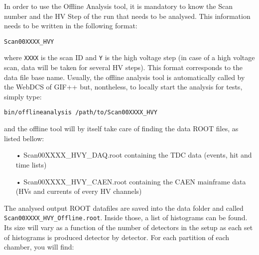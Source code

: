 	In order to use the Offline Analysis tool, it is mandatory to know the Scan number and the HV Step of the run that needs to be analysed. This information needs to be written in the following format:
	
	\begin{verbatim}
Scan00XXXX_HVY
	\end{verbatim}

	where \verb+XXXX+ is the scan ID and \verb+Y+ is the high voltage step (in case of a high voltage scan, data will be taken for several HV steps). This format corresponds to the data file base name. Usually, the offline analysis tool is automatically called by the WebDCS of GIF++ but, nontheless, to locally start the analysis for tests, simply type:
	
	\begin{verbatim}
bin/offlineanalysis /path/to/Scan00XXXX_HVY
	\end{verbatim}

	and the offline tool will by itself take care of finding the data ROOT files, as listed bellow:

	\begin{itemize}
		\item[•] Scan00XXXX\_HVY\_DAQ.root containing the TDC data (events, hit and time lists)
		\item[•] Scan00XXXX\_HVY\_CAEN.root containing the CAEN mainframe data (HVs and currents of every HV channels)
	\end{itemize}
	
	The analysed output ROOT datafiles are saved into the data folder and called \verb+Scan00XXXX_HVY_Offline.root+. Inside those, a list of  histograms can be found. Its size will vary as a function of the number of detectors in the setup as each set of histograms is produced detector by detector. For each partition of each chamber, you will find:

